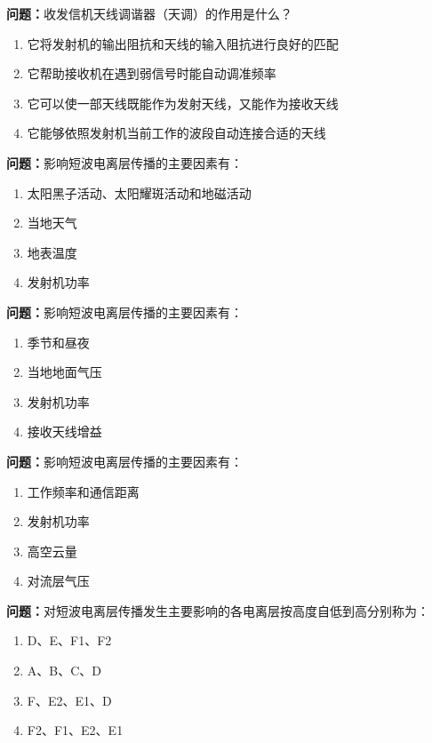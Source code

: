 \bigskip


\noindent\textbf{问题：}收发信机天线调谐器（天调）的作用是什么？
\begin{enumerate}[label=\Alph*), leftmargin=3em]
\item 它将发射机的输出阻抗和天线的输入阻抗进行良好的匹配
\item 它帮助接收机在遇到弱信号时能自动调准频率
\item 它可以使一部天线既能作为发射天线，又能作为接收天线
\item 它能够依照发射机当前工作的波段自动连接合适的天线
\end{enumerate}

\bigskip


\noindent\textbf{问题：}影响短波电离层传播的主要因素有：
\begin{enumerate}[label=\Alph*), leftmargin=3em]
\item 太阳黑子活动、太阳耀斑活动和地磁活动
\item 当地天气
\item 地表温度
\item 发射机功率
\end{enumerate}

\bigskip


\noindent\textbf{问题：}影响短波电离层传播的主要因素有：
\begin{enumerate}[label=\Alph*), leftmargin=3em]
\item 季节和昼夜
\item 当地地面气压
\item 发射机功率
\item 接收天线增益
\end{enumerate}

\bigskip


\noindent\textbf{问题：}影响短波电离层传播的主要因素有：
\begin{enumerate}[label=\Alph*), leftmargin=3em]
\item 工作频率和通信距离
\item 发射机功率
\item 高空云量
\item 对流层气压
\end{enumerate}

\bigskip


\noindent\textbf{问题：}对短波电离层传播发生主要影响的各电离层按高度自低到高分别称为：
\begin{enumerate}[label=\Alph*), leftmargin=3em]
\item D、E、F1、F2
\item A、B、C、D
\item F、E2、E1、D
\item F2、F1、E2、E1
\end{enumerate}

